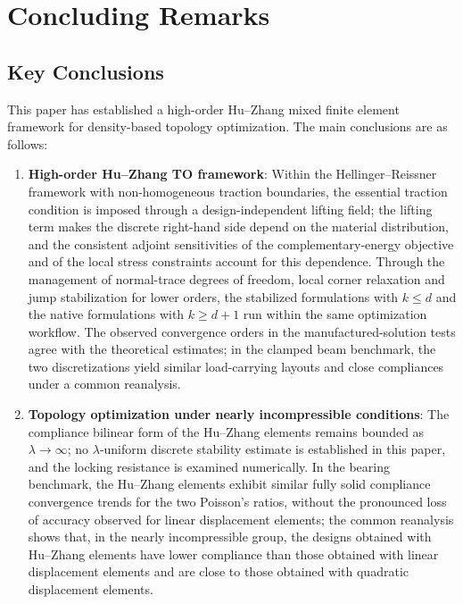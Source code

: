 \section{Concluding Remarks}
\label{sec:conclusions}

\subsection{Key Conclusions}
\label{subsec:key_conclusions}

This paper has established a high-order Hu--Zhang mixed finite element framework for density-based topology optimization. The main conclusions are as follows:
\begin{enumerate}
    \item \textbf{High-order Hu--Zhang TO framework}: Within the Hellinger--Reissner framework with non-homogeneous traction boundaries, the essential traction condition is imposed through a design-independent lifting field; the lifting term makes the discrete right-hand side depend on the material distribution, and the consistent adjoint sensitivities of the complementary-energy objective and of the local stress constraints account for this dependence. Through the management of normal-trace degrees of freedom, local corner relaxation and jump stabilization for lower orders, the stabilized formulations with $k\le d$ and the native formulations with $k\ge d+1$ run within the same optimization workflow. The observed convergence orders in the manufactured-solution tests agree with the theoretical estimates; in the clamped beam benchmark, the two discretizations yield similar load-carrying layouts and close compliances under a common reanalysis.
    \item \textbf{Topology optimization under nearly incompressible conditions}: The compliance bilinear form of the Hu--Zhang elements remains bounded as $\lambda\to\infty$; no $\lambda$-uniform discrete stability estimate is established in this paper, and the locking resistance is examined numerically. In the bearing benchmark, the Hu--Zhang elements exhibit similar fully solid compliance convergence trends for the two Poisson's ratios, without the pronounced loss of accuracy observed for linear displacement elements; the common reanalysis shows that, in the nearly incompressible group, the designs obtained with Hu--Zhang elements have lower compliance than those obtained with linear displacement elements and are close to those obtained with quadratic displacement elements.

\end{enumerate}
